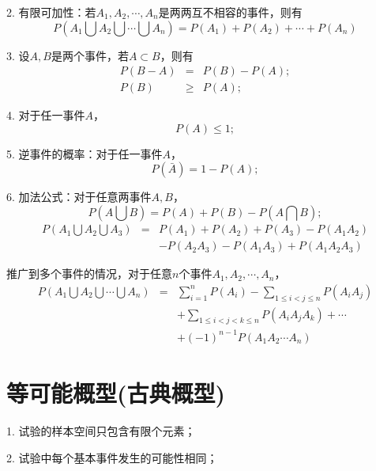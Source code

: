 \documentclass[12pt,a4paper]{article}
\begin{document}
2. 有限可加性：若$A_1, A_2, \cdots, A_n$是两两互不相容的事件，则有
\begin{equation}
P(A_1 \bigcup A_2 \bigcup \cdots \bigcup A_n) = P(A_1) + P(A_2) + \cdots +P(A_n)
\end{equation}

3. 设$A, B$是两个事件，若$A \subset B$，则有
\begin{eqnarray}
P(B-A) &=& P(B) -P(A); \\
P(B) &\geqslant& P(A);
\end{eqnarray}

4. 对于任一事件$A$，
\begin{equation}
P(A) \leqslant 1;
\end{equation}

5. 逆事件的概率：对于任一事件$A$，
\begin{equation}
P(\bar{A}) = 1- P(A); 
\end{equation}

6. 加法公式：对于任意两事件$A, B$，
\begin{equation}
P(A\bigcup B) = P(A) +P(B) -P(A\bigcap B);
\end{equation}
\begin{eqnarray}
\nonumber P(A_1\bigcup A_2 \bigcup A_3) &=& P(A_1) +P(A_2) +P(A_3) -P(A_1A_2)\\ 
&& -P(A_2A_3) -P(A_1A_3) +P(A_1A_2A_3)
\end{eqnarray}

推广到多个事件的情况，对于任意$n$个事件$A_1, A_2, \cdots, A_n$，
\begin{eqnarray}
\nonumber P(A_1\bigcup A_2 \bigcup \cdots \bigcup A_n) &=& \sum_{i=1}^n P(A_i) -\sum_{1\leqslant i < j \leqslant n} P(A_iA_j) \\
\nonumber && +\sum_{1\leqslant i < j < k \leqslant n} P(A_i A_j A_k) + \cdots \\
&& +(-1)^{n-1} P(A_1 A_2 \cdots A_n)
\end{eqnarray}


\section{等可能概型(古典概型)}
1. 试验的样本空间只包含有限个元素；

2. 试验中每个基本事件发生的可能性相同；
\end{document}
